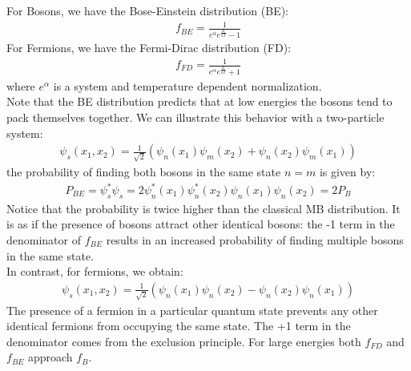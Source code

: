 \documentclass[11pt]{article}
\theoremstyle{break}
\theoremstyle{break}
\begin{document}
For Bosons, we have the Bose-Einstein distribution (BE):
\begin{align*}
f_{BE} = \frac{1}{e^{\alpha}e^{\frac{E}{kT}}-1}
\end{align*}
For Fermions, we have the Fermi-Dirac distribution (FD):
\begin{align*}
f_{FD} = \frac{1}{e^\alpha e^{\frac{E}{kT}}+1}
\end{align*}
where $e^{\alpha}$ is a system and temperature dependent normalization.\\

Note that the BE distribution predicts that at low energies the 
bosons tend to pack themselves together. We can illustrate this behavior with a two-particle system:
\begin{align*}
\psi_s(x_1,x_2) = \frac{1}{\sqrt{2}}\left( \psi_n(x_1) \psi_m(x_2) + \psi_n(x_2) \psi_m(x_1)\right)
\end{align*}
the probability of finding both bosons in the same state $n=m$ is given by:
\begin{align*}
P_{BE} = \psi_s^*\psi_s = 2\psi_n^*(x_1) \psi_n^*(x_2)\psi_n(x_1) \psi_n(x_2) = 2P_B
\end{align*}
Notice that the probability is twice higher than the classical MB distribution. It is as if the presence of bosons attract other identical bosons: the -1 term in the denominator of $f_{BE}$ results in an increased probability of finding multiple bosons in the same state.\\

In contrast, for fermions, we obtain:\begin{align*}
\psi_s(x_1,x_2) = \frac{1}{\sqrt{2}}\left( \psi_n(x_1) \psi_n(x_2) - \psi_n(x_2) \psi_n(x_1)\right)
\end{align*}
The presence of a fermion in a particular quantum state prevents 
any other identical fermions from occupying the same state. The +1 term in the denominator comes from the exclusion principle. For large energies both $f_{FD}$ and $f_{BE}$ approach $f_B$.\\
\end{document}

